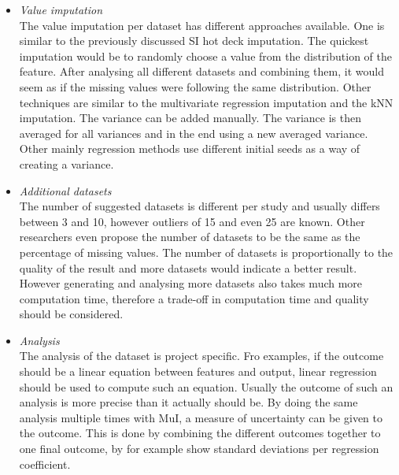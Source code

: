 \documentclass[10pt,a4paper]{report}
\begin{document}
	
	\begin{itemize}
		
		\item \textit{Value imputation} \\
		The value imputation per dataset has different approaches available. One is similar to the previously discussed SI hot deck imputation. The quickest imputation would be to randomly choose a value from the distribution of the feature. After analysing all different datasets and combining them, it would seem as if the missing values were following the same distribution. Other techniques are similar to the multivariate regression imputation and the kNN imputation\cite{pedersen2017missing, white2011multiple}. The variance can be added manually. The variance is then averaged for all variances and in the end using a new averaged variance\cite{donders2006gentle}. Other mainly regression methods use different initial seeds as a way of creating a variance\cite{he2010multiple}.
		
		\item \textit{Additional datasets} \\
		The number of suggested datasets is different per study and usually differs between 3 and 10\cite{van2007multiple, pedersen2017missing, van1999multiple, van2006imputation, azur2011multiple, royston2004multiple}, however outliers of 15\cite{martin2018impact} and even 25\cite{raghunathan2001multivariate} are known. Other researchers even propose the number of datasets to be the same as the percentage of missing values\cite{white2011multiple}. The number of datasets is proportionally to the quality of the result and more datasets would indicate a better result. However generating and analysing more datasets also takes much more computation time, therefore a trade-off in computation time and quality should be considered.
		
		\item \textit{Analysis} \\
		The analysis of the dataset is project specific. Fro examples, if the outcome should be a linear equation between features and output, linear regression should be used to compute such an equation. Usually the outcome of such an analysis is more precise than it actually should be. By doing the same analysis multiple times with MuI, a measure of uncertainty can be given to the outcome. This is done by combining the different outcomes together to one final outcome, by for example show standard deviations per regression coefficient\cite{donders2006gentle, van2006imputation}.
		
	\end{itemize}	
	
\end{document}
